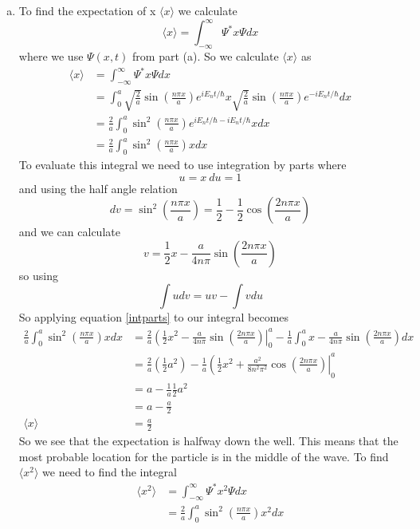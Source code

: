 \documentclass[11pt]{article}
\numberwithin{equation}{section}
\begin{document}
\begin{enumerate}[(a)]
\item
To find the expectation of x $\langle x\rangle$ we calculate
$$\langle x\rangle = \int_{-\infty}^{\infty}\Psi^*x\Psi dx$$
where we use $\Psi(x,t)$ from part (a). So we calculate $\langle x\rangle$ as
\begin{align*}
\langle x\rangle &= \int_{-\infty}^{\infty}\Psi^*x\Psi dx\\
&= \int_{0}^{a}\sqrt{\frac{2}{a}}\sin\left(\frac{n\pi x}{a}\right)e^{iE_nt/\hbar}x\sqrt{\frac{2}{a}}\sin\left(\frac{n\pi x}{a}\right)e^{-iE_nt/\hbar}dx\\
&= {\frac{2}{a}}\int_{0}^{a}\sin^2\left(\frac{n\pi x}{a}\right)e^{iE_nt/\hbar-iE_nt/\hbar}xdx\\
&= {\frac{2}{a}}\int_{0}^{a}\sin^2\left(\frac{n\pi x}{a}\right)xdx
\end{align*}
To evaluate this integral we need to use integration by parts where
$$u = x\ du = 1$$
and using the half angle relation 
$$dv = \sin^2\left(\frac{n\pi x}{a}\right) = \frac{1}{2} - \frac{1}{2}\cos\left(\frac{2n\pi x}{a}\right)$$
and we can calculate 
$$v = \frac{1}{2}x - \frac{a}{4n\pi}\sin\left(\frac{2n\pi x}{a}\right)$$
so using
\begin{equation}
\int udv = uv -\int vdu
\label{intparts}
\end{equation}
So applying equation \ref{intparts} to our integral becomes 
\begin{align*}
\frac{2}{a}\int_{0}^{a}\sin^2\left(\frac{n\pi x}{a}\right)xdx &= \frac{2}{a}\left(\frac{1}{2}x^2 - \frac{a}{4n\pi}\sin\left(\frac{2n\pi x}{a}\right)\right|_0^a  - \frac{1}{a}\int_{0}^{a}x-\frac{a}{4n\pi}\sin\left(\frac{2n\pi x}{a}\right)dx\\
&= \frac{2}{a}\left(\frac{1}{2}a^2\right) - \frac{1}{a}\left(\frac{1}{2}x^2+\frac{a^2}{8n^2\pi^2}\cos\left(\frac{2n\pi x}{a}\right)\right|_0^a\\
&= a - \frac{1}{a}\frac{1}{2}a^2\\
&= a - \frac{a}{2}\\
\langle x\rangle &= \frac{a}{2}
\end{align*}
So we see that the expectation is halfway down the well. This means that the most probable location for the particle is in the middle of the wave. To find $\langle x^2\rangle$ we need to find the integral 
\begin{align*}
\langle x^2\rangle &= \int_{-\infty}^{\infty}\Psi^*x^2\Psi dx\\
&= {\frac{2}{a}}\int_{0}^{a}\sin^2\left(\frac{n\pi x}{a}\right)x^2dx
\end{align*}

\end{enumerate}
\end{document}
